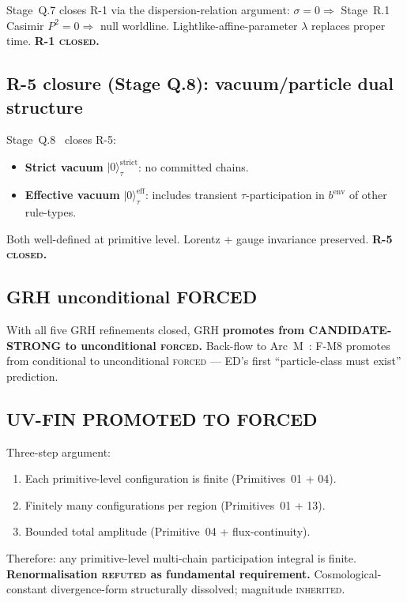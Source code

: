 \documentclass[11pt,a4paper]{article}
\begin{document}
Stage~Q.7 closes R-1 via the dispersion-relation argument: $\sigma = 0 \Rightarrow$ Stage~R.1 Casimir $P^2 = 0 \Rightarrow$ null worldline. Lightlike-affine-parameter $\lambda$ replaces proper time. \textbf{R-1 \textsc{closed}.}

\subsection{R-5 closure (Stage Q.8): vacuum/particle dual structure}

Stage~Q.8~\cite{q8vac} closes R-5:
\begin{itemize}
  \item \textbf{Strict vacuum} $|0\rangle_\tau^\mathrm{strict}$: no committed chains.
  \item \textbf{Effective vacuum} $|0\rangle_\tau^\mathrm{eff}$: includes transient $\tau$-participation in $b^\mathrm{env}$ of other rule-types.
\end{itemize}
Both well-defined at primitive level. Lorentz + gauge invariance preserved. \textbf{R-5 \textsc{closed}.}

\subsection{GRH unconditional FORCED}

With all five GRH refinements closed, GRH \textbf{promotes from CANDIDATE-STRONG to unconditional \textsc{forced}.} Back-flow to Arc~M~\cite{arcm}: F-M8 promotes from conditional to unconditional \textsc{forced} --- ED's first ``particle-class must exist'' prediction.

\subsection{UV-FIN PROMOTED TO FORCED}

Three-step argument:
\begin{enumerate}
  \item Each primitive-level configuration is finite (Primitives~01 + 04).
  \item Finitely many configurations per region (Primitives~01 + 13).
  \item Bounded total amplitude (Primitive~04 + flux-continuity).
\end{enumerate}
Therefore: any primitive-level multi-chain participation integral is finite. \textbf{Renormalisation \textsc{refuted} as fundamental requirement.} Cosmological-constant divergence-form structurally dissolved; magnitude \textsc{inherited}.
\end{document}
